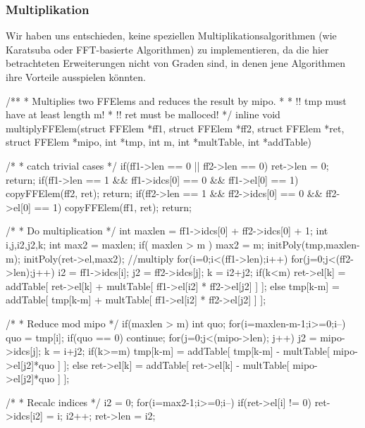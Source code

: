 \subsubsection{Multiplikation}
Wir haben uns entschieden, keine speziellen Multiplikationsalgorithmen 
(wie Karatsuba oder FFT-basierte Algorithmen) zu implementieren, da
die hier betrachteten Erweiterungen nicht von Graden sind, in denen jene
Algorithmen ihre Vorteile ausspielen könnten.

\begin{ccode}[caption={Aus \url{../Sage/enumeratePCNs.c}},
  firstnumber=302]
/**
 * Multiplies two FFElems and reduces the result by mipo.
 *
 * !! tmp must have at least length m!
 * !! ret must be malloced!
 */
inline void multiplyFFElem(struct FFElem *ff1, struct FFElem *ff2, 
        struct FFElem *ret, 
        struct FFElem *mipo, int *tmp, int m,
        int *multTable, int *addTable){
    /* 
     * catch trivial cases
     */
    if(ff1->len == 0 || ff2->len == 0){
        ret->len = 0;
        return;
    }
    if(ff1->len == 1 && ff1->idcs[0] == 0 && ff1->el[0] == 1){
        copyFFElem(ff2, ret);
        return;
    }
    if(ff2->len == 1 && ff2->idcs[0] == 0 && ff2->el[0] == 1){
        copyFFElem(ff1, ret);
        return;
    }

    /*
     * Do multiplication
     */
    int maxlen = ff1->idcs[0] + ff2->idcs[0] + 1;
    int i,j,i2,j2,k;
    int max2 = maxlen;
    if( maxlen > m ){
        max2 = m;
        initPoly(tmp,maxlen-m);
    }
    initPoly(ret->el,max2);
    //multiply 
    for(i=0;i<(ff1->len);i++){
        for(j=0;j<(ff2->len);j++){
            i2 = ff1->idcs[i];
            j2 = ff2->idcs[j];
            k = i2+j2;
            if(k<m){
                ret->el[k] = addTable[ ret->el[k] + 
                    multTable[ ff1->el[i2] * ff2->el[j2] ] ];
            }else{
                tmp[k-m] = addTable[ tmp[k-m] +
                    multTable[ ff1->el[i2] * ff2->el[j2] ] ];
            }
        }
    }
    
    /*
     * Reduce mod mipo
     */
    if(maxlen > m){
        int quo;
        for(i=maxlen-m-1;i>=0;i--){
            quo = tmp[i];
            if(quo == 0) continue;
            for(j=0;j<(mipo->len); j++){
                j2 = mipo->idcs[j];
                k = i+j2;
                if(k>=m){
                    tmp[k-m] = addTable[ tmp[k-m] - 
                        multTable[ mipo->el[j2]*quo ] ];
                }else{
                    ret->el[k] = addTable[ ret->el[k] - 
                        multTable[ mipo->el[j2]*quo ] ];
                }
            }
        }
    }

    /*
     * Recalc indices
     */
    i2 = 0;
    for(i=max2-1;i>=0;i--){
        if(ret->el[i] != 0){
            ret->idcs[i2] = i;
            i2++;
        }
    }
    ret->len = i2;
}
\end{ccode}
